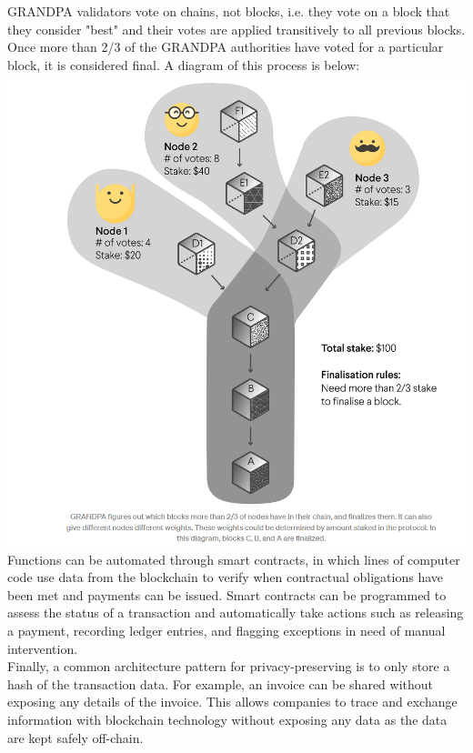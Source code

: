 GRANDPA validators vote on chains, not blocks, i.e. they vote on a block that they consider "best" and their votes are applied transitively to all previous blocks. Once more than 2/3 of the GRANDPA authorities have voted for a particular block, it is considered final. A diagram of this process is below:\\

\includegraphics[width=\linewidth]{figures/finality.png} \\

Functions can be automated through smart contracts, in which lines of computer code use data from the blockchain to verify when contractual obligations have been met and payments can be issued. Smart contracts can be programmed to assess the status of a transaction and automatically take actions such as releasing a payment, recording ledger entries, and flagging exceptions in need of manual intervention. \\

Finally, a common architecture pattern for privacy-preserving is to only store a hash of the transaction data. For example, an invoice can be shared without exposing any details of the invoice. This allows companies to trace and exchange information with blockchain technology without exposing any data as the data are kept safely off-chain. \\

